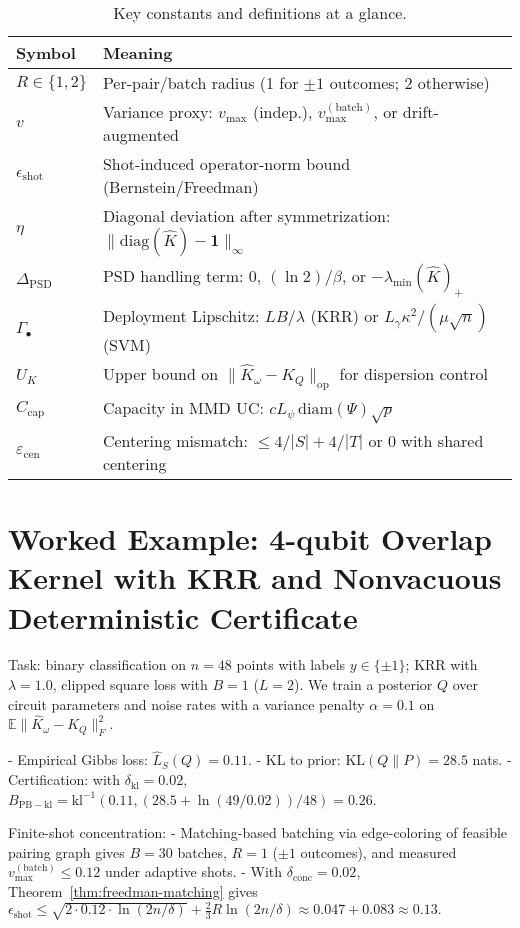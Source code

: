 \documentclass{article}
\begin{document}
\begin{table}[t]
\centering
\caption{Key constants and definitions at a glance.}
\begin{tabular}{ll}
\toprule
Symbol & Meaning \\
\midrule
$R\in\{1,2\}$ & Per-pair/batch radius (1 for $\pm 1$ outcomes; 2 otherwise) \\
$v$ & Variance proxy: $v_{\max}$ (indep.), $v_{\max}^{(\mathrm{batch})}$, or drift-augmented \\
$\epsilon_{\mathrm{shot}}$ & Shot-induced operator-norm bound (Bernstein/Freedman) \\
$\eta$ & Diagonal deviation after symmetrization: $\|\mathrm{diag}(\widehat{K})-\mathbf{1}\|_\infty$ \\
$\Delta_{\mathrm{PSD}}$ & PSD handling term: $0$, $(\ln 2)/\beta$, or $-\lambda_{\min}(\widehat{K})_+$ \\
$\Gamma_{\bullet}$ & Deployment Lipschitz: $LB/\lambda$ (KRR) or $L_\gamma \kappa^2/(\mu \sqrt{n})$ (SVM) \\
$U_K$ & Upper bound on $\|\widehat{K}_\omega-K_Q\|_{\mathrm{op}}$ for dispersion control \\
$C_{\mathrm{cap}}$ & Capacity in MMD UC: $c L_\psi\, \mathrm{diam}(\Psi)\sqrt{p}$ \\
$\varepsilon_{\mathrm{cen}}$ & Centering mismatch: $\le 4/|S|+4/|T|$ or $0$ with shared centering \\
\bottomrule
\end{tabular}
\end{table}

\section{Worked Example: 4-qubit Overlap Kernel with KRR and Nonvacuous Deterministic Certificate}\label{sec:worked}
Task: binary classification on $n=48$ points with labels $y\in\{\pm 1\}$; KRR with $\lambda=1.0$, clipped square loss with $B=1$ ($L=2$). We train a posterior $Q$ over circuit parameters and noise rates with a variance penalty $\alpha=0.1$ on $\mathbb{E}\|\widehat{K}_\omega-K_Q\|_F^2$.

- Empirical Gibbs loss: $\hat{L}_S(Q)=0.11$.
- KL to prior: $\mathrm{KL}(Q\|P)=28.5$ nats.
- Certification: with $\delta_{\mathrm{kl}}=0.02$, $B_{\mathrm{PB-kl}}=\mathrm{kl}^{-1}(0.11,(28.5+\ln(49/0.02))/48)=0.26$.

Finite-shot concentration:
- Matching-based batching via edge-coloring of feasible pairing graph gives $B=30$ batches, $R=1$ ($\pm 1$ outcomes), and measured $v_{\max}^{(\mathrm{batch})}\le 0.12$ under adaptive shots.
- With $\delta_{\mathrm{conc}}=0.02$, Theorem~\ref{thm:freedman-matching} gives
$\epsilon_{\mathrm{shot}} \le \sqrt{2\cdot 0.12\cdot \ln(2n/\delta)} + \frac{2}{3} R \ln(2n/\delta) \approx 0.047 + 0.083 \approx 0.13.$
\end{document}
